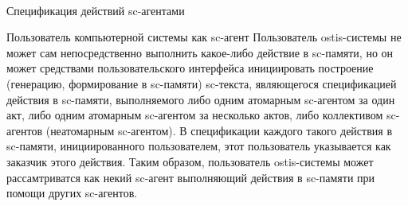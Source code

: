 \begin{frame}{\\Спецификация действий sc-агентами}
		\topline
	\justifying
	\begin{SCn}
	\end{SCn}
\end{frame}

\begin{frame}{Пользователь компьютерной системы как sc-агент}
		\topline
	\justifying
	Пользователь ostis-системы не может сам непосредственно выполнить какое-либо действие в sc-памяти, но он может средствами пользовательского интерфейса инициировать построение (генерацию, формирование в sc-памяти) sc-текста, являющегося спецификацией действия в sc-памяти, выполняемого либо одним атомарным sc-агентом за один акт, либо одним атомарным sc-агентом за несколько актов, либо коллективом sc-агентов (неатомарным sc-агентом). В спецификации каждого такого действия в sc-памяти, инициированного пользователем, этот пользователь указывается как заказчик этого действия. Таким образом, пользователь ostis-системы может рассамтриватся как некий sc-агент выполняющий действия в sc-памяти при помощи других sc-агентов.
\end{frame}

